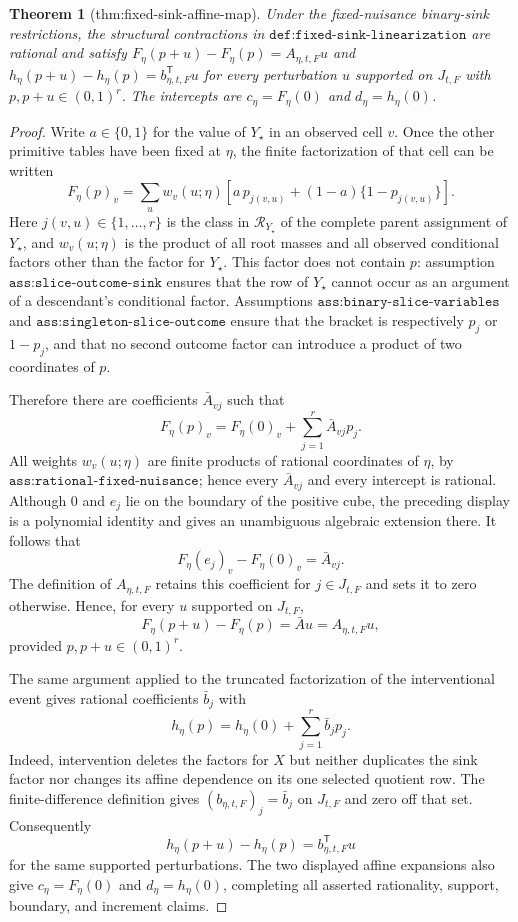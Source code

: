 \documentclass{article}
\newtheorem{theorem}{Theorem}
\begin{document}
\begin{theorem}[thm:fixed-sink-affine-map]\label{thm:fixed-sink-affine-map}
Under the fixed-nuisance binary-sink restrictions, the structural contractions in \(\texttt{def:fixed-sink-linearization}\) are rational and satisfy \(F_{\eta}(p+u)-F_{\eta}(p)=A_{\eta,t,F}u\) and \(h_{\eta}(p+u)-h_{\eta}(p)=b_{\eta,t,F}^{\mathsf T}u\) for every perturbation \(u\) supported on \(J_{t,F}\) with \(p,p+u\in(0,1)^r\). The intercepts are \(c_{\eta}=F_{\eta}(0)\) and \(d_{\eta}=h_{\eta}(0)\).
\end{theorem}
\begin{proof}
Write \(a\in\{0,1\}\) for the value of \(Y_\star\) in an observed cell \(v\). Once the other primitive tables have been fixed at \(\eta\), the finite factorization of that cell can be written
\[
 F_{\eta}(p)_v
 =\sum_{u} w_v(u;\eta)
 \left[a\,p_{j(v,u)}+(1-a)\{1-p_{j(v,u)}\}\right].
\]
Here \(j(v,u)\in\{1,\ldots,r\}\) is the class in \(\mathcal R_{Y_\star}\) of the complete parent assignment of \(Y_\star\), and \(w_v(u;\eta)\) is the product of all root masses and all observed conditional factors other than the factor for \(Y_\star\). This factor does not contain \(p\): assumption \(\texttt{ass:slice-outcome-sink}\) ensures that the row of \(Y_\star\) cannot occur as an argument of a descendant's conditional factor. Assumptions \(\texttt{ass:binary-slice-variables}\) and \(\texttt{ass:singleton-slice-outcome}\) ensure that the bracket is respectively \(p_j\) or \(1-p_j\), and that no second outcome factor can introduce a product of two coordinates of \(p\).

Therefore there are coefficients \(\bar A_{vj}\) such that
\[
 F_\eta(p)_v=F_\eta(0)_v+\sum_{j=1}^r\bar A_{vj}p_j.
\]
All weights \(w_v(u;\eta)\) are finite products of rational coordinates of \(\eta\), by \(\texttt{ass:rational-fixed-nuisance}\); hence every \(\bar A_{vj}\) and every intercept is rational. Although \(0\) and \(e_j\) lie on the boundary of the positive cube, the preceding display is a polynomial identity and gives an unambiguous algebraic extension there. It follows that
\[
 F_\eta(e_j)_v-F_\eta(0)_v=\bar A_{vj}.
\]
The definition of \(A_{\eta,t,F}\) retains this coefficient for \(j\in J_{t,F}\) and sets it to zero otherwise. Hence, for every \(u\) supported on \(J_{t,F}\),
\[
 F_\eta(p+u)-F_\eta(p)=\bar A u=A_{\eta,t,F}u,
\]
provided \(p,p+u\in(0,1)^r\).

The same argument applied to the truncated factorization of the interventional event gives rational coefficients \(\bar b_j\) with
\[
 h_\eta(p)=h_\eta(0)+\sum_{j=1}^r\bar b_jp_j.
\]
Indeed, intervention deletes the factors for \(X\) but neither duplicates the sink factor nor changes its affine dependence on its one selected quotient row. The finite-difference definition gives \((b_{\eta,t,F})_j=\bar b_j\) on \(J_{t,F}\) and zero off that set. Consequently
\[
 h_\eta(p+u)-h_\eta(p)=b_{\eta,t,F}^{\mathsf T}u
\]
for the same supported perturbations. The two displayed affine expansions also give \(c_\eta=F_\eta(0)\) and \(d_\eta=h_\eta(0)\), completing all asserted rationality, support, boundary, and increment claims.
\end{proof}
\end{document}
